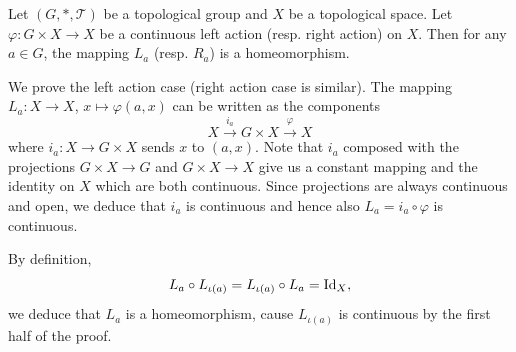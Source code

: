 \begin{propositionenv}\label{prop:5.2.3}
    Let $(G,*,\mathscr{T})$ be a topological group and $X$ be a topological space.
    Let $\varphi: G \times X \rightarrow X$ be a continuous left action (resp. right action) on $X$.
    Then for any $a \in G$, the mapping $L_a$ (resp. $R_a$) is a homeomorphism.
\end{propositionenv}
\begin{proofenv}
    We prove the left action case (right action case is similar).
    The mapping $L_a : X\rightarrow X$, $x \mapsto \varphi(a,x)$ can be written as the components
    $$ X \overset{i_a}{\longrightarrow} G \times X \overset{\varphi}{\longrightarrow} X$$
    where $i_a : X \rightarrow G\times X$ sends $x$ to $(a,x)$.
    Note that $i_a$ composed with the projections $G\times X \rightarrow G$ and $G \times X \rightarrow X$ give us a constant mapping and the identity on $X$ which are both continuous.
    Since projections are always continuous and open, we deduce that $i_a$ is continuous and hence also $L_a = i_a \circ \varphi$ is continuous.

    \quad By definition, 
    $$ L_a \circ L_{\iota(a)} = L_{\iota(a)} \circ L_{a} = \operatorname{\mathrm{Id}}_{X},$$
    we deduce that $L_a$ is a homeomorphism, cause $L_{\iota(a)}$ is continuous by the first half of the proof.
\end{proofenv}

